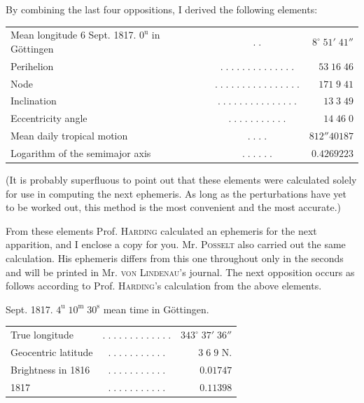 \par\indent By combining the last four oppositions, I derived the following elements:
\begin{center}\fontsize{9}{11}\selectfont\setlength{\tabcolsep}{2pt}\renewcommand{\arraystretch}{1.15}\begin{tabular}{lcr}
Mean longitude 6 Sept. 1817. $0^{\mathrm u}$ in Göttingen & $.\;.$ & $8^\circ\;51'\;41''$\\
Perihelion & $.\;.\;.\;.\;.\;.\;.\;.\;.\;.\;.\;.\;.\;.$ & $53\;16\;46$\\
Node & $.\;.\;.\;.\;.\;.\;.\;.\;.\;.\;.\;.\;.\;.\;.\;.$ & $171\;9\;41$\\
Inclination & $.\;.\;.\;.\;.\;.\;.\;.\;.\;.\;.\;.\;.\;.\;.$ & $13\;3\;49$\\
Eccentricity angle & $.\;.\;.\;.\;.\;.\;.\;.\;.\;.\;.$ & $14\;46\;0$\\
Mean daily tropical motion & $.\;.\;.\;.$ & $812''40187$\\
Logarithm of the semimajor axis & $.\;.\;.\;.\;.\;.$ & $0.4269223$\\
\end{tabular}\end{center}

\par\indent (It is probably superfluous to point out that these elements were calculated solely for use in computing the next ephemeris. As long as the perturbations have yet to be worked out, this method is the most convenient and the most accurate.)
\par\indent From these elements Prof. \textsc{Harding} calculated an ephemeris for the next apparition, and I enclose a copy for you. Mr. \textsc{Posselt} also carried out the same calculation. His ephemeris differs from this one throughout only in the seconds and will be printed in Mr. \textsc{von Lindenau}’s journal. The next opposition occurs as follows according to Prof. \textsc{Harding}’s calculation from the above elements.
\begin{center}\fontsize{10}{12} Sept. 1817. $4^{\mathrm u}\;10^{\mathrm m}\;30^{\mathrm s}$ mean time in Göttingen.\par
\setlength{\tabcolsep}{3pt}\begin{tabular}{lcr}
True longitude & $.\;.\;.\;.\;.\;.\;.\;.\;.\;.\;.\;.\;.$ & $343^\circ\;37'\;36''$\\
Geocentric latitude & $.\;.\;.\;.\;.\;.\;.\;.\;.\;.\;.$ & $3\;6\;9$ N.\\
Brightness in 1816 & $.\;.\;.\;.\;.\;.\;.\;.\;.\;.\;.$ & $0.01747$\\
\hfill1817 & $.\;.\;.\;.\;.\;.\;.\;.\;.\;.\;.$ & $0.11398$\\
\end{tabular}\end{center}

